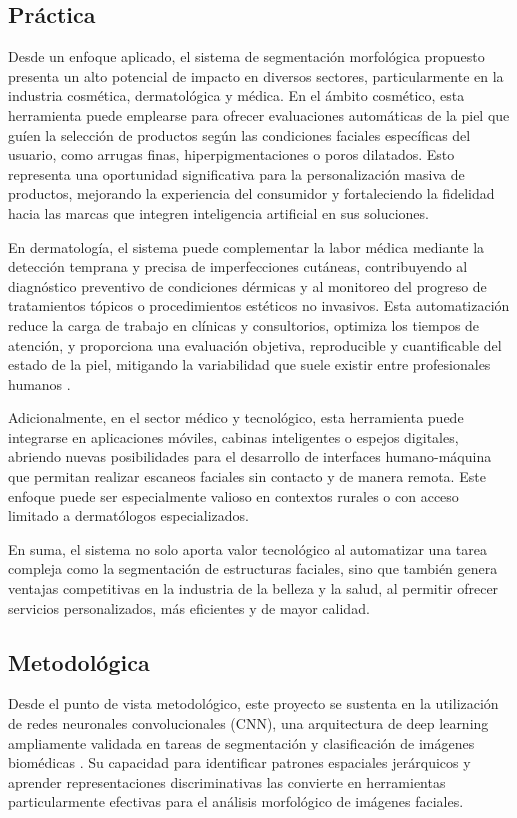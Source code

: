 \subsection{Práctica}
Desde un enfoque aplicado, el sistema de segmentación morfológica propuesto presenta un alto potencial de impacto en diversos sectores, particularmente en la industria cosmética, dermatológica y médica. En el ámbito cosmético, esta herramienta puede emplearse para ofrecer evaluaciones automáticas de la piel que guíen la selección de productos según las condiciones faciales específicas del usuario, como arrugas finas, hiperpigmentaciones o poros dilatados. Esto representa una oportunidad significativa para la personalización masiva de productos, mejorando la experiencia del consumidor y fortaleciendo la fidelidad hacia las marcas que integren inteligencia artificial en sus soluciones.

En dermatología, el sistema puede complementar la labor médica mediante la detección temprana y precisa de imperfecciones cutáneas, contribuyendo al diagnóstico preventivo de condiciones dérmicas y al monitoreo del progreso de tratamientos tópicos o procedimientos estéticos no invasivos. Esta automatización reduce la carga de trabajo en clínicas y consultorios, optimiza los tiempos de atención, y proporciona una evaluación objetiva, reproducible y cuantificable del estado de la piel, mitigando la variabilidad que suele existir entre profesionales humanos \parencite{huang2020}.

Adicionalmente, en el sector médico y tecnológico, esta herramienta puede integrarse en aplicaciones móviles, cabinas inteligentes o espejos digitales, abriendo nuevas posibilidades para el desarrollo de interfaces humano-máquina que permitan realizar escaneos faciales sin contacto y de manera remota. Este enfoque puede ser especialmente valioso en contextos rurales o con acceso limitado a dermatólogos especializados.

En suma, el sistema no solo aporta valor tecnológico al automatizar una tarea compleja como la segmentación de estructuras faciales, sino que también genera ventajas competitivas en la industria de la belleza y la salud, al permitir ofrecer servicios personalizados, más eficientes y de mayor calidad.

\subsection{Metodológica}

Desde el punto de vista metodológico, este proyecto se sustenta en la utilización de redes neuronales convolucionales (CNN), una arquitectura de deep learning ampliamente validada en tareas de segmentación y clasificación de imágenes biomédicas \parencite{ronneberger2015}. Su capacidad para identificar patrones espaciales jerárquicos y aprender representaciones discriminativas las convierte en herramientas particularmente efectivas para el análisis morfológico de imágenes faciales.

